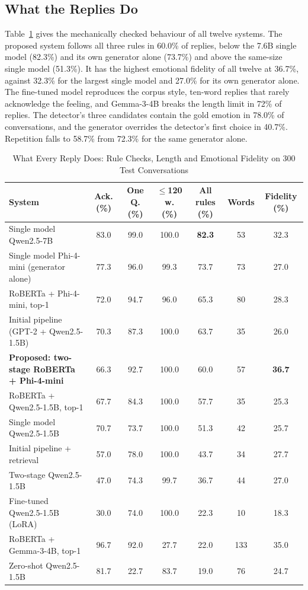\subsection{What the Replies Do}
Table~\ref{tab:main} gives the mechanically checked behaviour of all twelve systems. The proposed system follows all three rules in 60.0\% of replies, below the 7.6B single model (82.3\%) and its own generator alone (73.7\%) and above the same-size single model (51.3\%). It has the highest emotional fidelity of all twelve at 36.7\%, against 32.3\% for the largest single model and 27.0\% for its own generator alone. The fine-tuned model reproduces the corpus style, ten-word replies that rarely acknowledge the feeling, and Gemma-3-4B breaks the length limit in 72\% of replies. The detector's three candidates contain the gold emotion in 78.0\% of conversations, and the generator overrides the detector's first choice in 40.7\%. Repetition falls to 58.7\% from 72.3\% for the same generator alone.

\begin{table}[htbp]
\caption{What Every Reply Does: Rule Checks, Length and Emotional Fidelity on 300 Test Conversations}
\begin{center}
\begin{tabular}{|l|c|c|c|c|c|c|}
\hline
\textbf{System} & \textbf{Ack. (\%)} & \textbf{One Q. (\%)} & \textbf{$\leq$120 w. (\%)} & \textbf{All rules (\%)} & \textbf{Words} & \textbf{Fidelity (\%)} \\
\hline
Single model Qwen2.5-7B & 83.0 & 99.0 & 100.0 & \textbf{82.3} & 53 & 32.3 \\
Single model Phi-4-mini (generator alone) & 77.3 & 96.0 & 99.3 & 73.7 & 73 & 27.0 \\
RoBERTa + Phi-4-mini, top-1 & 72.0 & 94.7 & 96.0 & 65.3 & 80 & 28.3 \\
Initial pipeline (GPT-2 + Qwen2.5-1.5B) & 70.3 & 87.3 & 100.0 & 63.7 & 35 & 26.0 \\
\textbf{Proposed: two-stage RoBERTa + Phi-4-mini} & 66.3 & 92.7 & 100.0 & 60.0 & 57 & \textbf{36.7} \\
RoBERTa + Qwen2.5-1.5B, top-1 & 67.7 & 84.3 & 100.0 & 57.7 & 35 & 25.3 \\
Single model Qwen2.5-1.5B & 70.7 & 73.7 & 100.0 & 51.3 & 42 & 25.7 \\
Initial pipeline + retrieval & 57.0 & 78.0 & 100.0 & 43.7 & 34 & 27.7 \\
Two-stage Qwen2.5-1.5B & 47.0 & 74.3 & 99.7 & 36.7 & 44 & 27.0 \\
Fine-tuned Qwen2.5-1.5B (LoRA) & 30.0 & 74.0 & 100.0 & 22.3 & 10 & 18.3 \\
RoBERTa + Gemma-3-4B, top-1 & 96.7 & 92.0 & 27.7 & 22.0 & 133 & 35.0 \\
Zero-shot Qwen2.5-1.5B & 81.7 & 22.7 & 83.7 & 19.0 & 76 & 24.7 \\
\hline
\end{tabular}
\label{tab:main}
\end{center}
\end{table}

